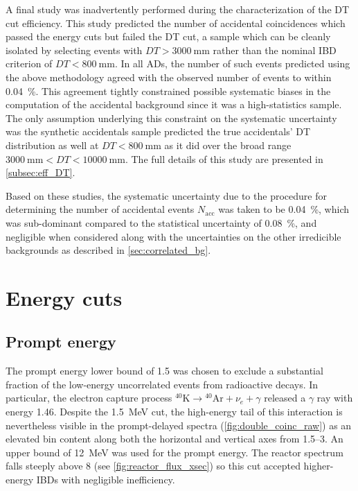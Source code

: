 A final study was inadvertently performed
during the characterization of the DT cut efficiency.
This study predicted the number of accidental coincidences
which passed the energy cuts but failed the DT cut,
a sample which can be cleanly isolated
by selecting events with $DT > \SI{3000}{\mm}$
rather than the nominal IBD criterion of $DT < \SI{800}{\mm}$.
In all ADs, the number of such events
predicted using the above methodology
agreed with the observed number of events
to within \SI{0.04}{\percent}.
This agreement tightly constrained possible systematic biases
in the computation of the accidental background
since it was a high-statistics sample.
The only assumption underlying this constraint on the systematic uncertainty
was the synthetic accidentals sample
predicted the true accidentals' DT distribution as well at $DT < \SI{800}{\mm}$
as it did over the broad range $\SI{3000}{\mm} < DT < \SI{10000}{\mm}$.
The full details of this study are presented in \cref{subsec:eff_DT}.

Based on these studies, the systematic uncertainty
due to the procedure for determining the number of accidental events $N_{\text{acc}}$
was taken to be \SI{0.04}{\percent},
which was sub-dominant compared to the statistical uncertainty of \SI{0.08}{\percent},
and negligible when considered along with
the uncertainties on the other irredicible backgrounds
as described in \cref{sec:correlated_bg}.

\section{Energy cuts}
\label{sec:energy_cuts}

\subsection{Prompt energy}
\label{subsec:prompt_energy}
The prompt energy lower bound of \SI{1.5}{\mev}
was chosen to exclude a substantial fraction
of the low-energy uncorrelated events from radioactive decays.
In particular, the electron capture process
${}^{40}\text{K} \to {}^{40}\text{Ar} + \nu_e + \gamma$
released a $\gamma$ ray with energy \SI{1.46}{\mev}.
Despite the \SI{1.5}{\MeV} cut,
the high-energy tail of this interaction is nevertheless visible in the prompt-delayed spectra
(\cref{fig:double_coinc_raw}) as an elevated bin content
along both the horizontal and vertical axes from \SIrange{1.5}{3}{\mev}.
An upper bound of \SI{12}{\MeV} was used for the prompt energy.
The reactor \nuebar{} spectrum falls steeply above \SI{8}{\mev}
(see \cref{fig:reactor_flux_xsec})
so this cut accepted higher-energy IBDs with negligible inefficiency.

